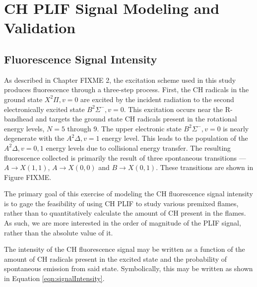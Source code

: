 \chapter{CH PLIF Signal Modeling and Validation}





\section{Fluorescence Signal Intensity}

As described in Chapter FIXME 2, the excitation scheme used in this study produces fluorescence through a three-step process.
First, the CH radicals in the ground state \(X^2\Pi, v=0\) are excited by the incident radiation to the second electronically excited state \(B^2\Sigma^-, v=0\).
This excitation occurs near the R-bandhead and targets the ground state CH radicals present in the rotational energy levels, \(N=5\) through 9.
The upper electronic state \(B^2\Sigma^-, v=0\) is nearly degenerate with the \(A^2\Delta, v=1\) energy level.
This leads to the population of the \(A^2\Delta, v=0,1\) energy levels due to collisional energy transfer.
The resulting fluorescence collected is primarily the result of three spontaneous transitions --- \(A\rightarrow X(1,1)\), \(A\rightarrow X(0,0)\) and \(B\rightarrow X(0,1)\).
These transitions are shown in Figure FIXME.

The primary goal of this exercise of modeling the CH fluorescence signal intensity is to gage the feasibility of using CH PLIF to study various premixed flames, rather than to quantitatively calculate the amount of CH present in the flames.
As such, we are more interested in the order of magnitude of the PLIF signal, rather than the absolute value of it.

The intensity of the CH fluorescence signal may be written as a function of the amount of CH radicals present in the excited state and the probability of spontaneous emission from said state.
Symbolically, this may be written as shown in Equation \ref{eqn:signalIntensity}.

